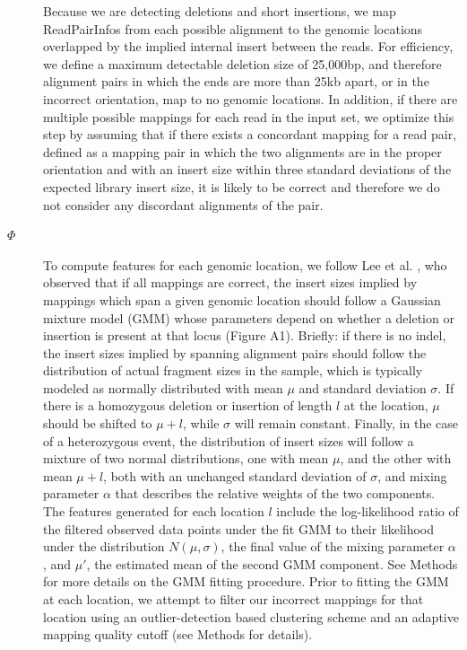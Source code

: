 \begin{description}
\item[] Because we are detecting deletions and short insertions, we map ReadPairInfos from each possible alignment to the genomic locations overlapped by the implied internal insert between the reads. For efficiency, we define a maximum detectable deletion size of 25,000bp, and therefore alignment pairs in which the ends are more than 25kb apart, or in the incorrect orientation, map to no genomic locations. In addition, if there are multiple possible mappings for each read in the input set, we optimize this step by assuming that if there exists a concordant mapping for a read pair, defined as a mapping pair in which the two alignments are in the proper orientation and with an insert size within three standard deviations of the expected library insert size, it is likely to be correct and therefore we do not consider any discordant alignments of the pair.
\item[$\Phi$] To compute features for each genomic location, we follow Lee et al. \cite{Lee:2009da}, who observed that if all mappings are correct, the insert sizes implied by mappings which span a given genomic location should follow a Gaussian mixture model (GMM) whose parameters depend on whether a deletion or insertion is present at that locus (Figure A1). Briefly: if there is no indel, the insert sizes implied by spanning alignment pairs should follow the distribution of actual fragment sizes in the sample, which is typically modeled as normally distributed with mean $\mu$ and standard deviation $\sigma$. If there is a homozygous deletion or insertion of length $l$ at the location, $\mu$ should be shifted to $\mu + l$, while $\sigma$ will remain constant. Finally, in the case of a heterozygous event, the distribution of insert sizes will follow a mixture of two normal distributions, one with mean $\mu$, and the other with mean $\mu + l$, both with an unchanged standard deviation of $\sigma$, and mixing parameter $\alpha$ that describes the relative weights of the two components. The features generated for each location $l$ include the log-likelihood ratio of the filtered observed data points under the fit GMM to their likelihood under the distribution $N(\mu,\sigma)$, the final value of the mixing parameter $\alpha$, and $\mu'$, the estimated mean of the second GMM component. See Methods for more details on the GMM fitting procedure. Prior to fitting the GMM at each location, we attempt to filter our incorrect mappings for that location using an outlier-detection based clustering scheme and an adaptive mapping quality cutoff (see Methods for details).


\end{description}
